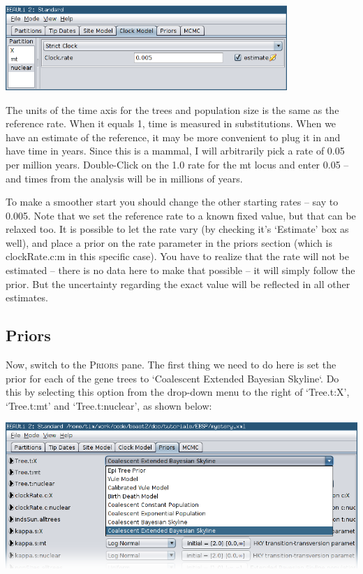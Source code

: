 \documentclass[a4paper,11pt]{article}
\begin{document}
\begin{center}
\includegraphics[width=0.8\textwidth]{figures/clock_model4.png}
\end{center}

The units of the time axis for the trees and population size is the same as the
reference rate. When it equals 1, time is measured in substitutions. When we
have an estimate of the reference, it may be more convenient to plug it in and
have time in years. Since this is a mammal, I will arbitrarily pick a rate of
0.05 per million years. Double-Click on the 1.0 rate for the mt locus and enter
0.05 – and times from the analysis will be in millions of years.

To make a smoother start you should change the other starting rates – say to
0.005.  Note that we set the reference rate to a known fixed value, but that
can be relaxed too. It is possible to let the rate vary (by checking it's
`Estimate' box as well), and place a prior on the rate parameter in the priors
section (which is clockRate.c:m in this specific case). You have to realize
that the rate will not be estimated – there is no data here to make that
possible – it will simply follow the prior. But the uncertainty regarding the
exact value will be reflected in all other estimates.

\subsection{Priors}

Now, switch to the \textsc{Priors} pane. The first thing we need to do here is
set the prior for each of the gene trees to `Coalescent Extended Bayesian
Skyline`.  Do this by selecting this option from the drop-down menu to the
right of `Tree.t:X', `Tree.t:mt' and `Tree.t:nuclear', as shown below:

\includegraphics[width=\textwidth]{figures/tree_prior.png}
\end{document}

